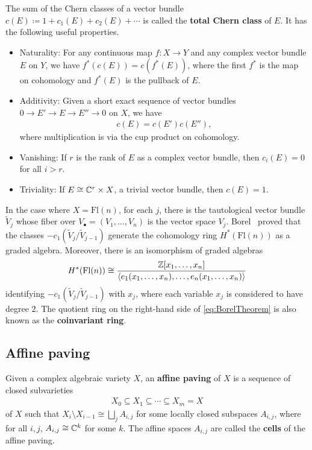\documentclass[11pt]{amsart}
\theoremstyle{definition}
\newcommand{\Fl}{\mathrm{Fl}}
\begin{document}
The sum of the Chern classes of a vector bundle $c(E) \coloneqq 1+c_1(E) + c_2(E) +\cdots$ is called the {\bf total Chern class} of $E$. It has the following useful properties.
\begin{itemize}
    \item Naturality: For any continuous map $f : X \to Y$ and any complex vector bundle $E$ on $Y$, we have $f^*(c(E)) = c(f^*(E))$, where the first $f^*$ is the map on cohomology and $f^*(E)$ is the pullback of $E$.
    \item Additivity: Given a short exact sequence of vector bundles $0\to E'\to E\to E''\to 0$ on $X$, we have
    \begin{align}
        c(E) = c(E')c(E''),
    \end{align}
    where multiplication is via the cup product on cohomology.
    \item Vanishing: If $r$ is the rank of $E$ as a complex vector bundle, then $c_i(E) = 0$ for all $i>r$.
    \item Triviality: If $E \cong \mathbb{C}^r \times X$, a trivial vector bundle, then $c(E) = 1$.
\end{itemize}

In the case where $X = \Fl(n)$, for each $j$, there is the tautological vector bundle $\widetilde V_j$ whose fiber over $V_\bullet = (V_1,\dots, V_n)$ is the vector space $V_{j}$. Borel~\cite{Borel} proved that the classes $-c_1(\widetilde V_j/\widetilde V_{j-1})$ generate the cohomology ring $H^*(\Fl(n))$ as a graded algebra. Moreover, there is an isomorphism of graded algebras
\begin{align}\label{eq:BorelTheorem}
    H^*(\Fl(n)) \cong \frac{\bZ[x_1,\dots, x_n]}{\langle e_1(x_1,\dots, x_n),\dots, e_n(x_1,\dots, x_n)\rangle}
\end{align}
identifying $-c_1(\widetilde V_j/\widetilde V_{j-1})$ with $x_j$, where each variable $x_j$ is considered to have degree $2$.
The quotient ring on the right-hand side of \eqref{eq:BorelTheorem} is also known as the \textbf{coinvariant ring}.





\subsection{Affine paving}

Given a complex algebraic variety $X$, an {\bf affine paving} of $X$ is a sequence of closed subvarieties
\begin{align} \label{eq:affine-paving}
    X_0 \subseteq X_1\subseteq \cdots \subseteq X_m = X
\end{align}
of $X$ such that $X_i\setminus X_{i-1} \cong \bigsqcup_j A_{i,j}$ for some locally closed subspaces $A_{i,j}$, where for all $i,j$, $A_{i,j}\cong \mathbb{C}^k$ for some $k$. The affine spaces $A_{i,j}$ are called the {\bf cells} of the affine paving.
\end{document}
